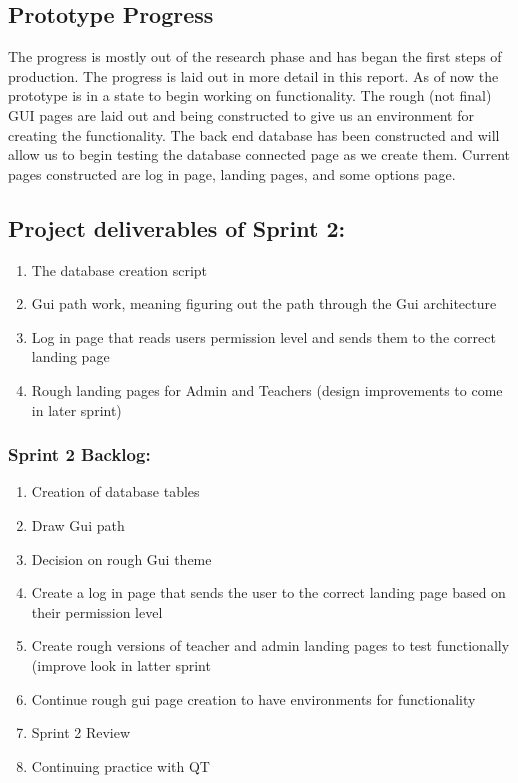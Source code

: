 \subsection{Prototype Progress}
The progress is mostly out of the research phase and has began the first steps of production. The progress is laid out in more detail in this report. As of now the prototype is in a state to begin working on functionality. The rough (not final) GUI pages are laid out and being constructed to give us an environment for creating the functionality. The back end database has been constructed and will allow us to begin testing the database connected page as we create them. Current pages constructed are log in page, landing pages, and some options page.

\subsection{Project deliverables of Sprint 2:}

\begin{enumerate}
\item The database creation script  
\item Gui path work, meaning figuring out the path through the Gui architecture 
\item Log in page that reads users permission level and sends them to the correct landing page
\item Rough landing pages for Admin and Teachers (design improvements to come in later sprint) 
\end{enumerate}


\subsubsection{Sprint 2 Backlog:}

\begin{enumerate}
\item Creation of database tables 
\item Draw Gui path
\item Decision on rough Gui theme
\item Create a log in page that sends the user to the correct landing page based on their permission level
\item Create rough versions of teacher and admin landing pages to test functionally (improve look in latter sprint 
\item Continue rough gui page creation to have environments for functionality 
\item Sprint 2 Review
\item Continuing practice with QT
\end{enumerate}

